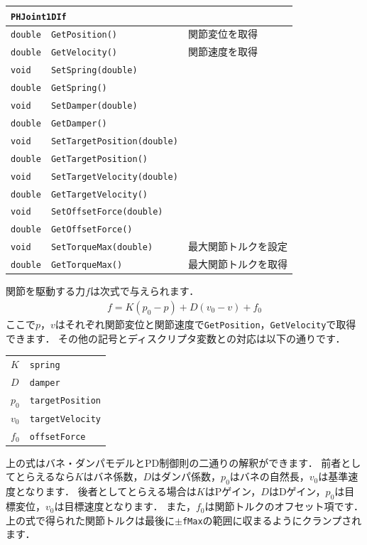 \begin{center}
\begin{longtable}{p{.15\hsize}p{.45\hsize}p{.30\hsize}}
\multicolumn{3}{l}{\texttt{PHJoint1DIf}}						\\ \midrule
\texttt{double}	& \texttt{GetPosition()}				& \KLUDGE 関節変位を取得 \\
\texttt{double} & \texttt{GetVelocity()}				& \KLUDGE 関節速度を取得 \\
\texttt{void} 	& \texttt{SetSpring(double)}			& \\
\texttt{double} & \texttt{GetSpring()}					& \\
\texttt{void} 	& \texttt{SetDamper(double)}			& \\
\texttt{double} & \texttt{GetDamper()}					& \\
\texttt{void} 	& \texttt{SetTargetPosition(double)}	& \\
\texttt{double} & \texttt{GetTargetPosition()}			& \\
\texttt{void} 	& \texttt{SetTargetVelocity(double)}	& \\
\texttt{double} & \texttt{GetTargetVelocity()}			& \\
\texttt{void} 	& \texttt{SetOffsetForce(double)}		& \\
\texttt{double} & \texttt{GetOffsetForce()}				& \\
\texttt{void} 	& \texttt{SetTorqueMax(double)}			& \KLUDGE 最大関節トルクを設定 \\
\texttt{double} & \texttt{GetTorqueMax()}				& \KLUDGE 最大関節トルクを取得 \\
\end{longtable}
\end{center}

\KLUDGE 関節を駆動する力$f$\KLUDGE は次式で与えられます．
\begin{align*}
f = K(p_0 - p) + D(v_0 - v) + f_0
\end{align*}
\KLUDGE ここで$p$\KLUDGE ，$v$\KLUDGE はそれぞれ関節変位と関節速度で\texttt{GetPosition}\KLUDGE ，\texttt{GetVelocity}\KLUDGE で取得できます．
\KLUDGE その他の記号とディスクリプタ変数との対応は以下の通りです．
\begin{center}
\begin{tabular}{ll}
$K$		&	\texttt{spring}				\\
$D$		&	\texttt{damper}				\\
$p_0$	&	\texttt{targetPosition}		\\
$v_0$	&	\texttt{targetVelocity}		\\
$f_0$	&	\texttt{offsetForce}
\end{tabular}
\end{center}
\KLUDGE 上の式はバネ・ダンパモデルとPD\KLUDGE 制御則の二通りの解釈ができます．
\KLUDGE 前者としてとらえるなら$K$\KLUDGE はバネ係数，$D$\KLUDGE はダンパ係数，$p_0$\KLUDGE はバネの自然長，$v_0$\KLUDGE は基準速度となります．
\KLUDGE 後者としてとらえる場合は$K$\KLUDGE はP\KLUDGE ゲイン，$D$\KLUDGE はD\KLUDGE ゲイン，$p_0$\KLUDGE は目標変位，$v_0$\KLUDGE は目標速度となります．
\KLUDGE また，$f_0$\KLUDGE は関節トルクのオフセット項です．
\KLUDGE 上の式で得られた関節トルクは最後に$\pm$\texttt{fMax}\KLUDGE の範囲に収まるようにクランプされます．


